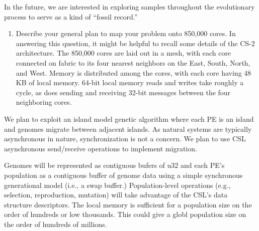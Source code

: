 In the future, we are interested in exploring samples throughout the evolutionary process to serve as a kind of ``fossil record.''

\begin{enumerate}[resume] \itshape
\item Describe your general plan to map your problem onto 850,000 cores. In answering this question, it might be helpful to recall some details of the CS-2 architecture.
The 850,000 cores are laid out in a mesh, with each core connected on fabric to its four nearest neighbors on the East, South, North, and West.
Memory is distributed among the cores, with each core having 48 KB of local memory.
64-bit local memory reads and writes take roughly a cycle, as does sending and receiving 32-bit messages between the four neighboring cores.
\end{enumerate}

We plan to exploit an island model genetic algorithm where each PE is an island and genomes migrate between adjacent islands.
As natural systems are typically asynchronous in nature, synchronization is not a concern.
We plan to use CSL asynchronous send/receive operations to implement migration.

Genomes will be represented as contiguous bufers of u32 and each PE's population as a contiguous buffer of genome data using a simple synchronous generational model (i.e., a swap buffer.)
Population-level operations (e.g., selection, reproduction, mutation) will take advantage of the CSL's data structure descriptors.
The local memory is sufficient for a population size on the order of hundreds or low thousands.
This could give a globl population size on the order of hundreds of millions.
